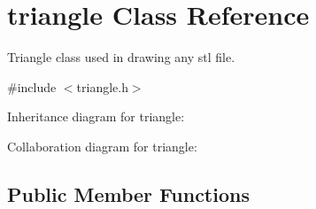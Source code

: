 \hypertarget{classtriangle}{}\section{triangle Class Reference}
\label{classtriangle}


Triangle class used in drawing any stl file.  




{\ttfamily \#include $<$triangle.\+h$>$}



Inheritance diagram for triangle\+:


Collaboration diagram for triangle\+:
\subsection*{Public Member Functions}
